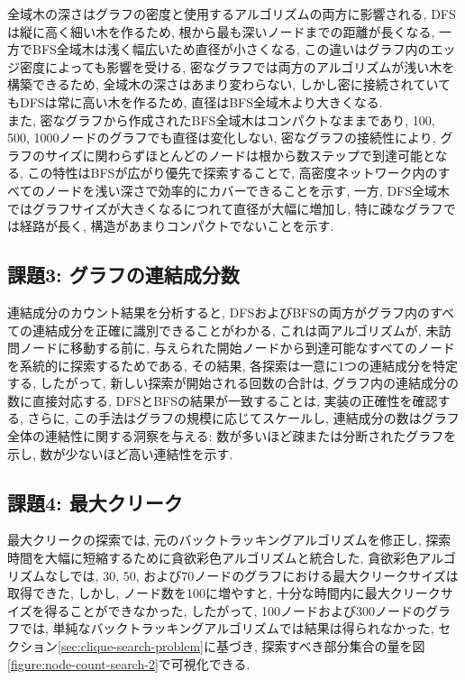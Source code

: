 \documentclass[a4j, 12pt]{jarticle}
\begin{document}
全域木の深さはグラフの密度と使用するアルゴリズムの両方に影響される, DFSは縦に高く細い木を作るため, 根から最も深いノードまでの距離が長くなる, 一方でBFS全域木は浅く幅広いため直径が小さくなる, この違いはグラフ内のエッジ密度によっても影響を受ける, 密なグラフでは両方のアルゴリズムが浅い木を構築できるため, 全域木の深さはあまり変わらない, しかし密に接続されていてもDFSは常に高い木を作るため, 直径はBFS全域木より大きくなる.\\

また, 密なグラフから作成されたBFS全域木はコンパクトなままであり, 100, 500, 1000ノードのグラフでも直径は変化しない, 密なグラフの接続性により, グラフのサイズに関わらずほとんどのノードは根から数ステップで到達可能となる, この特性はBFSが広がり優先で探索することで, 高密度ネットワーク内のすべてのノードを浅い深さで効率的にカバーできることを示す, 一方, DFS全域木ではグラフサイズが大きくなるにつれて直径が大幅に増加し, 特に疎なグラフでは経路が長く, 構造があまりコンパクトでないことを示す.

\subsection{課題3: グラフの連結成分数}
連結成分のカウント結果を分析すると, DFSおよびBFSの両方がグラフ内のすべての連結成分を正確に識別できることがわかる, これは両アルゴリズムが, 未訪問ノードに移動する前に, 与えられた開始ノードから到達可能なすべてのノードを系統的に探索するためである, その結果, 各探索は一意に1つの連結成分を特定する, したがって, 新しい探索が開始される回数の合計は, グラフ内の連結成分の数に直接対応する, DFSとBFSの結果が一致することは, 実装の正確性を確認する, さらに, この手法はグラフの規模に応じてスケールし, 連結成分の数はグラフ全体の連結性に関する洞察を与える: 数が多いほど疎または分断されたグラフを示し, 数が少ないほど高い連結性を示す.

\subsection{課題4: 最大クリーク}
最大クリークの探索では, 元のバックトラッキングアルゴリズムを修正し, 探索時間を大幅に短縮するために貪欲彩色アルゴリズムと統合した, 貪欲彩色アルゴリズムなしでは, 30, 50, および70ノードのグラフにおける最大クリークサイズは取得できた, しかし, ノード数を100に増やすと, 十分な時間内に最大クリークサイズを得ることができなかった, したがって, 100ノードおよび300ノードのグラフでは, 単純なバックトラッキングアルゴリズムでは結果は得られなかった, セクション\ref{sec:clique-search-problem}に基づき, 探索すべき部分集合の量を図\ref{figure:node-count-search-2}で可視化できる.
\end{document}
